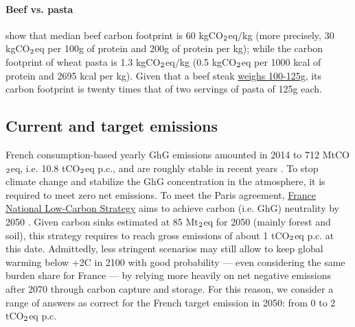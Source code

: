 \documentclass[english,5p,authoryear]{elsarticle}
\begin{document}
\begin{appendices}
\paragraph{Beef vs. pasta}

\citet{poore_reducing_2018} show that median beef carbon footprint is 60 kgCO$_\textnormal{2}$eq$/$kg (more precisely, 30 kgCO$_\textnormal{2}$eq per 100g of protein and 200g of protein per kg); while the carbon footprint of wheat pasta is 1.3 kgCO$_\textnormal{2}$eq$/$kg (0.5 kgCO$_\textnormal{2}$eq per 1000 kcal of protein and 2695 kcal per kg). Given that a beef steak \href{http://www.lessentieldesviandes-pro.org/introduction.php}{weighs 100-125g}, its carbon footprint is twenty times that of two servings of pasta of 125g each. 

\subsection{Current and target emissions\label{app:emission}}

French consumption-based yearly GhG emissions amounted in 2014 to 712 MtCO$_\textnormal{2}$eq, i.e. 10.8 tCO$_\textnormal{2}$eq p.c., and are roughly stable in recent years \citep{cgdd_chiffres_2019}. To stop climate change and stabilize the GhG concentration in the atmosphere, it is required to meet zero net emissions. To meet the Paris agreement,  \href{https://www.ecologique-solidaire.gouv.fr/strategie-nationale-bas-carbone-snbc}{France National Low-Carbon Strategy} aims to achieve carbon (i.e. GhG) neutrality by 2050 \citep{ministry_of_ecology_france_2015}. Given carbon sinks estimated at 85 Mt$_\textnormal{2}$eq for 2050 (mainly forest and soil), this strategy requires to reach gross emissions of about 1 tCO$_\textnormal{2}$eq p.c. at this date. Admittedly, less stringent scenarios may still allow to keep global warming below +2\textdegree{}C in 2100 with good probability --- even considering the same burden share for France --- by relying more heavily on net negative emissions after 2070 through carbon capture and storage. For this reason, we consider a range of answers as correct for the French target emission in 2050: from 0 to 2 tCO$_\textnormal{2}$eq p.c.



\end{appendices}
\end{document}
